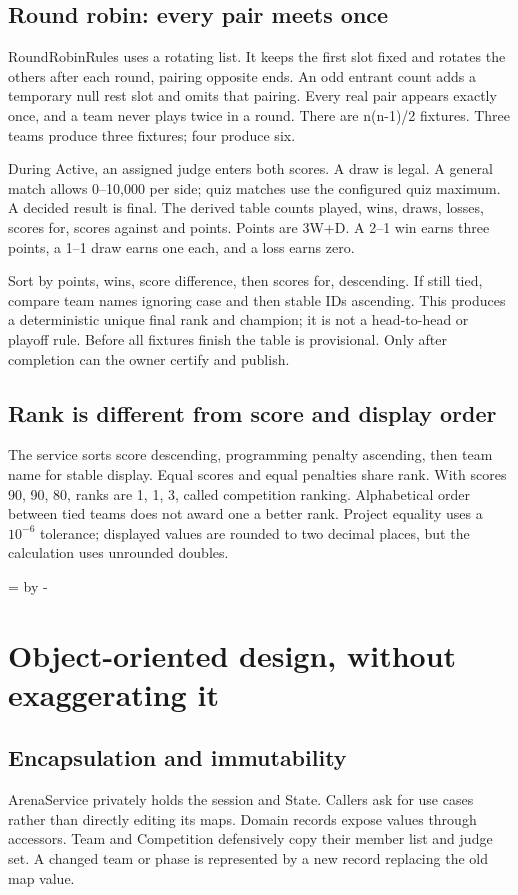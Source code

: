 \documentclass[12pt]{article}
\newcommand{\topic}[1]{\needroom{9\baselineskip}\section{#1}}
\newcommand{\needroom}[1]{\par\begingroup\dimen0=\pagegoal\advance\dimen0 by -\pagetotal\ifdim\dimen0<#1\newpage\fi\endgroup}
\begin{document}
\subsection{Round robin: every pair meets once}
RoundRobinRules uses a rotating list. It keeps the first slot fixed and rotates the others after each round, pairing opposite ends. An odd entrant count adds a temporary null rest slot and omits that pairing. Every real pair appears exactly once, and a team never plays twice in a round. There are n(n-1)/2 fixtures. Three teams produce three fixtures; four produce six.

During Active, an assigned judge enters both scores. A draw is legal. A general match allows 0--10,000 per side; quiz matches use the configured quiz maximum. A decided result is final. The derived table counts played, wins, draws, losses, scores for, scores against and points. Points are 3W+D. A 2--1 win earns three points, a 1--1 draw earns one each, and a loss earns zero.

Sort by points, wins, score difference, then scores for, descending. If still tied, compare team names ignoring case and then stable IDs ascending. This produces a deterministic unique final rank and champion; it is not a head-to-head or playoff rule. Before all fixtures finish the table is provisional. Only after completion can the owner certify and publish.

\subsection{Rank is different from score and display order}
The service sorts score descending, programming penalty ascending, then team name for stable display. Equal scores and equal penalties share rank. With scores 90, 90, 80, ranks are 1, 1, 3, called competition ranking. Alphabetical order between tied teams does not award one a better rank. Project equality uses a $10^{-6}$ tolerance; displayed values are rounded to two decimal places, but the calculation uses unrounded doubles.

\topic{Object-oriented design, without exaggerating it}
\subsection{Encapsulation and immutability}
ArenaService privately holds the session and State. Callers ask for use cases rather than directly editing its maps. Domain records expose values through accessors. Team and Competition defensively copy their member list and judge set. A changed team or phase is represented by a new record replacing the old map value.
\end{document}
